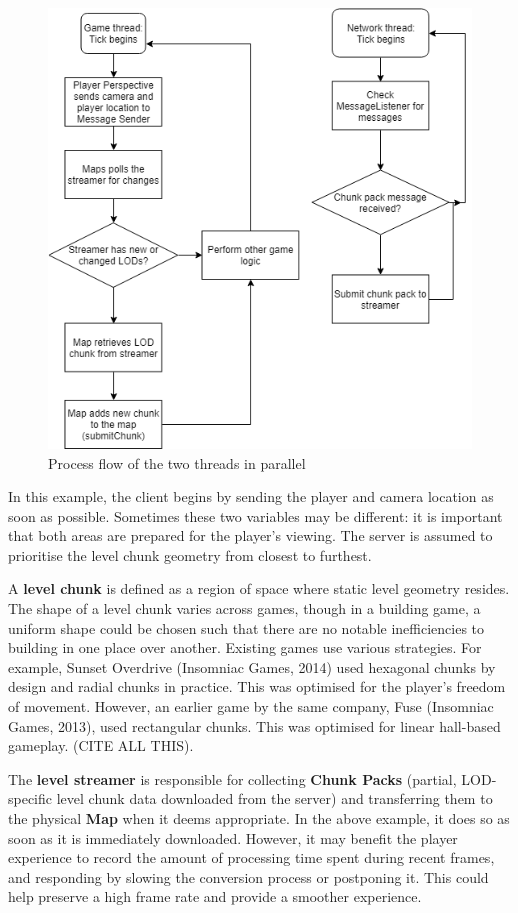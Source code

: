 \documentclass{scrartcl}
\begin{document}
\begin{figure}[H]
	\includegraphics[width=0.7\linewidth]{Basic_Flowchart.png}
	\caption{Process flow of the two threads in parallel}
	\label{fig:simpleflow}
\end{figure}

In this example, the client begins by sending the player and camera location as soon as possible. Sometimes these two variables may be different: it is important that both areas are prepared for the player's viewing. The server is assumed to prioritise the level chunk geometry from closest to furthest.

A \textbf{level chunk} is defined as a region of space where static level geometry resides. The shape of a level chunk varies across games, though in a building game, a uniform shape could be chosen such that there are no notable inefficiencies to building in one place over another. Existing games use various strategies. For example, Sunset Overdrive (Insomniac Games, 2014) used hexagonal chunks by design and radial chunks in practice. This was optimised for the player's freedom of movement. However, an earlier game by the same company, Fuse (Insomniac Games, 2013), used rectangular chunks. This was optimised for linear hall-based gameplay. (CITE ALL THIS).

The \textbf{level streamer} is responsible for collecting \textbf{Chunk Packs} (partial, LOD-specific level chunk data downloaded from the server) and transferring them to the physical \textbf{Map} when it deems appropriate. In the above example, it does so as soon as it is immediately downloaded. However, it may benefit the player experience to record the amount of processing time spent during recent frames, and responding by slowing the conversion process or postponing it. This could help preserve a high frame rate and provide a smoother experience.
\end{document}
